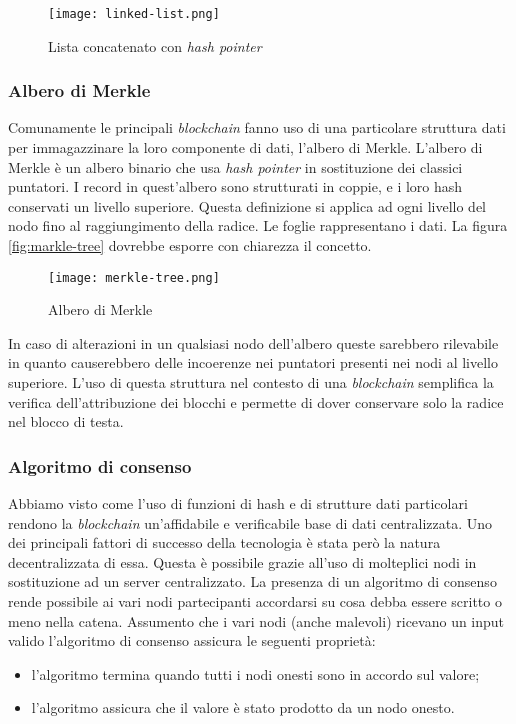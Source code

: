 \begin{figure}[!h]
    \centering
    \texttt{[image: linked-list.png]}
    \caption{Lista concatenato con \emph{hash pointer}}
    \label{fig:linked-list} 
\end{figure}

\subsubsection{Albero di Merkle}
Comunamente le principali \emph{blockchain} fanno uso di una particolare struttura dati per immagazzinare la loro componente di dati, l'albero di Merkle. L'albero di Merkle è un albero binario che usa \emph{hash pointer} in sostituzione dei classici puntatori. I record in quest'albero sono strutturati in coppie, e i loro hash conservati un livello superiore. Questa definizione si applica ad ogni livello del nodo fino al raggiungimento della radice. Le foglie rappresentano i dati. La figura \ref{fig:markle-tree} dovrebbe esporre con chiarezza il concetto.

\begin{figure}[!h]
    \centering
    \texttt{[image: merkle-tree.png]}
    \caption{Albero di Merkle}
    \label{fig:merkle-tree} 
\end{figure}

In caso di alterazioni in un qualsiasi nodo dell'albero queste sarebbero rilevabile in quanto causerebbero delle incoerenze nei puntatori presenti nei nodi al livello superiore. L'uso di questa struttura nel contesto di una \emph{blockchain} semplifica la verifica dell'attribuzione dei blocchi e permette di dover conservare solo la radice nel blocco di testa.

\subsubsection{Algoritmo di consenso}
\label{cap:alg-cons}
Abbiamo visto come l'uso di funzioni di hash e di strutture dati particolari rendono la \emph{blockchain} un'affidabile e verificabile base di dati centralizzata. Uno dei principali fattori di successo della tecnologia è stata però la natura decentralizzata di essa. Questa è possibile grazie all'uso di molteplici nodi in sostituzione ad un server centralizzato. La presenza di un algoritmo di consenso rende possibile ai vari nodi partecipanti accordarsi su cosa debba essere scritto o meno nella catena. Assumento che i vari nodi (anche malevoli) ricevano un input valido l'algoritmo di consenso assicura le seguenti proprietà:
\begin{itemize}
    \item l'algoritmo termina quando tutti i nodi onesti sono in accordo sul valore;
    \item l'algoritmo assicura che il valore è stato prodotto da un nodo onesto. 
\end{itemize}

